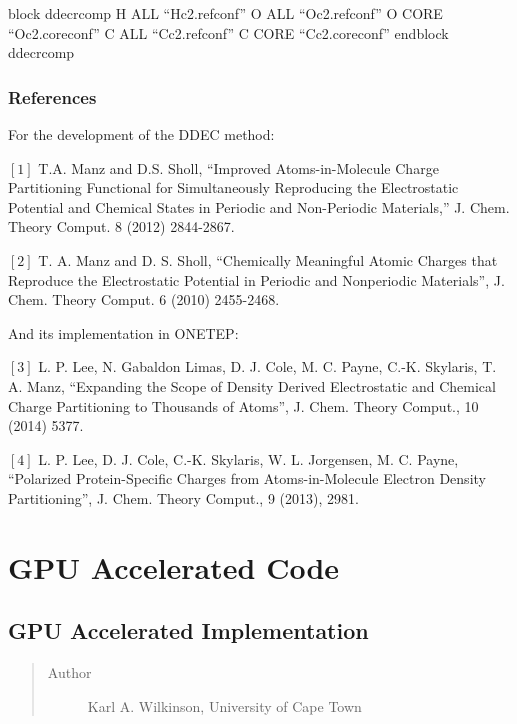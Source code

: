 \documentclass[letterpaper,10pt,english]{sphinxmanual}
\begin{document}
%
\begin{sphinxVerbatim}[commandchars=\\\{\}]
\PYGZpc{}block ddec\PYGZus{}rcomp
  H ALL “H\PYGZus{}c2.refconf”
  O ALL “O\PYGZus{}c2.refconf”
  O CORE “O\PYGZus{}c2.coreconf”
  C ALL “C\PYGZus{}c2.refconf”
  C CORE “C\PYGZus{}c2.coreconf”
\PYGZpc{}endblock ddec\PYGZus{}rcomp
\end{sphinxVerbatim}


\subsection{References}
\label{\detokenize{ddec:references}}
\begin{DUlineblock}{0em}
\item[] For the development of the DDEC method:
\item[] \([1]\) T.A. Manz and D.S. Sholl, “Improved Atoms-in-Molecule
Charge Partitioning Functional for Simultaneously Reproducing the
Electrostatic Potential and Chemical States in Periodic and
Non-Periodic Materials,” J. Chem. Theory Comput. 8 (2012) 2844-2867.
\item[] \([2]\) T. A. Manz and D. S. Sholl, “Chemically Meaningful Atomic
Charges that Reproduce the Electrostatic Potential in Periodic and
Nonperiodic Materials”, J. Chem. Theory Comput. 6 (2010) 2455-2468.
\item[] And its implementation in ONETEP:
\item[] \([3]\) L. P. Lee, N. Gabaldon Limas, D. J. Cole, M. C. Payne,
C.-K. Skylaris, T. A. Manz, “Expanding the Scope of Density Derived
Electrostatic and Chemical Charge Partitioning to Thousands of Atoms”,
J. Chem. Theory Comput., 10 (2014) 5377.
\item[] \([4]\) L. P. Lee, D. J. Cole, C.-K. Skylaris, W. L. Jorgensen, M.
C. Payne, “Polarized Protein-Specific Charges from Atoms-in-Molecule
Electron Density Partitioning”, J. Chem. Theory Comput., 9 (2013),
2981.
\end{DUlineblock}


\chapter{GPU Accelerated Code}
\label{\detokenize{index_gpu::doc}}\label{\detokenize{index_gpu:gpu-accelerated-code}}

\section{GPU Accelerated Implementation}
\label{\detokenize{ONETEP_OpenACC::doc}}\label{\detokenize{ONETEP_OpenACC:gpu-accelerated-implementation}}\begin{quote}\begin{description}
\item[{Author}] \leavevmode
Karl A. Wilkinson, University of Cape Town %
\begin{footnote}[1]\sphinxAtStartFootnote
{}
%
\end{footnote}

\end{description}\end{quote}
\end{document}
